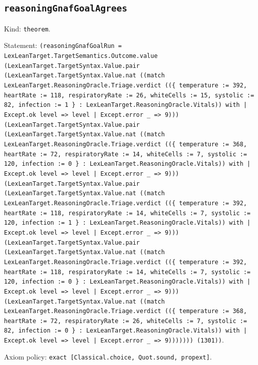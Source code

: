 \documentclass[11pt]{article}
\begin{document}
\subsection*{\texttt{reasoningGnafGoalAgrees}}
\noindent Kind: \texttt{theorem}.\par
\noindent Statement: \texttt{(reasoningGnafGoalRun = LexLeanTarget.TargetSemantics.Outcome.value (LexLeanTarget.TargetSyntax.Value.pair (LexLeanTarget.TargetSyntax.Value.nat ((match LexLeanTarget.ReasoningOracle.Triage.verdict ((\{ temperature := 392, heartRate := 118, respiratoryRate := 26, whiteCells := 15, systolic := 82, infection := 1 \} : LexLeanTarget.ReasoningOracle.Vitals)) with | Except.ok level => level | Except.error \_ => 9))) (LexLeanTarget.TargetSyntax.Value.pair (LexLeanTarget.TargetSyntax.Value.nat ((match LexLeanTarget.ReasoningOracle.Triage.verdict ((\{ temperature := 368, heartRate := 72, respiratoryRate := 14, whiteCells := 7, systolic := 120, infection := 0 \} : LexLeanTarget.ReasoningOracle.Vitals)) with | Except.ok level => level | Except.error \_ => 9))) (LexLeanTarget.TargetSyntax.Value.pair (LexLeanTarget.TargetSyntax.Value.nat ((match LexLeanTarget.ReasoningOracle.Triage.verdict ((\{ temperature := 392, heartRate := 118, respiratoryRate := 14, whiteCells := 7, systolic := 120, infection := 1 \} : LexLeanTarget.ReasoningOracle.Vitals)) with | Except.ok level => level | Except.error \_ => 9))) (LexLeanTarget.TargetSyntax.Value.pair (LexLeanTarget.TargetSyntax.Value.nat ((match LexLeanTarget.ReasoningOracle.Triage.verdict ((\{ temperature := 392, heartRate := 118, respiratoryRate := 14, whiteCells := 7, systolic := 120, infection := 0 \} : LexLeanTarget.ReasoningOracle.Vitals)) with | Except.ok level => level | Except.error \_ => 9))) (LexLeanTarget.TargetSyntax.Value.nat ((match LexLeanTarget.ReasoningOracle.Triage.verdict ((\{ temperature := 368, heartRate := 72, respiratoryRate := 26, whiteCells := 7, systolic := 82, infection := 0 \} : LexLeanTarget.ReasoningOracle.Vitals)) with | Except.ok level => level | Except.error \_ => 9))))))) (1301))}.\par
\noindent Axiom policy: \texttt{exact [Classical.choice, Quot.sound, propext]}.\par
\end{document}
